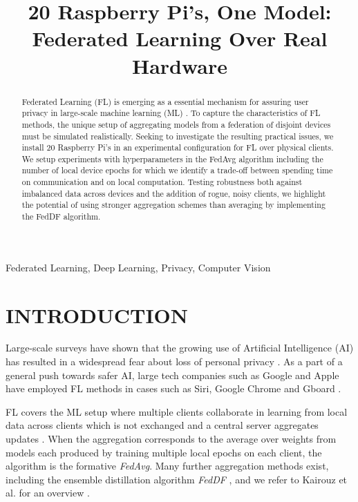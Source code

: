 \documentclass{article}
\title{20 Raspberry Pi's, One Model: Federated Learning Over Real Hardware}
\begin{document}
%

\maketitle
%
\begin{abstract}
    Federated Learning (FL) is emerging as a essential mechanism for assuring user privacy in large-scale machine learning (ML) \cite{kai2021advances}.
    To capture the characteristics of FL methods, the unique setup of aggregating models from a federation of disjoint devices must be simulated realistically.
    Seeking to investigate the resulting practical issues, we install 20 Raspberry Pi's in an experimental configuration for FL over physical clients.
    We setup experiments with hyperparameters in the FedAvg \cite{mcmahan2017communication} algorithm including the number of local device epochs for which we identify a trade-off between spending time on communication and on local computation.
    Testing robustness both against imbalanced data across devices and the addition of rogue, noisy clients, we highlight the potential of using stronger aggregation schemes than averaging by implementing the FedDF \cite{lin2020ensemble} algorithm.
\end{abstract}
%
\begin{keywords}
    Federated Learning, Deep Learning, Privacy, Computer Vision
\end{keywords}

\section{INTRODUCTION}
\label{sec:intro}
Large-scale surveys have shown that the growing use of Artificial Intelligence (AI) has resulted in a widespread fear about loss of personal privacy \cite{beuc2020consumers, west2018survey}.
As a part of a general push towards safer AI, large tech companies such as Google and Apple have employed FL methods in cases such as Siri, Google Chrome and Gboard \cite{kai2021advances}.

FL covers the ML setup where multiple clients collaborate in learning from local data across clients which is not exchanged and a central server aggregates updates \cite{kai2021advances, mcmahan2017communication}.
When the aggregation corresponds to the average over weights from models each produced by training multiple local epochs on each client, the algorithm is the formative \emph{FedAvg}\cite{mcmahan2017communication}.
Many further aggregation methods exist, including the ensemble distillation algorithm \emph{FedDF} \cite{lin2020ensemble}, and we refer to Kairouz et al. for an overview \cite{kai2021advances}.
\end{document}
